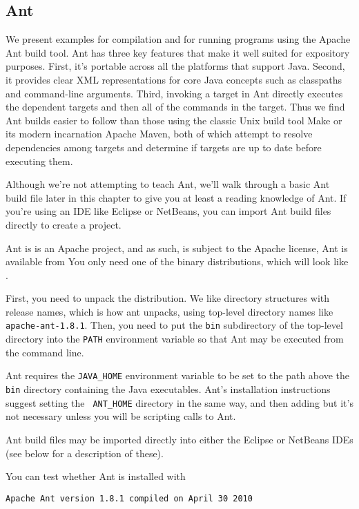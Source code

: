 \subsection{Ant}

We present examples for compilation and for running programs
using the Apache Ant build tool.  Ant has three key features that make
it well suited for expository purposes.  First, it's portable across
all the platforms that support Java.  Second, it provides clear XML
representations for core Java concepts such as classpaths and
command-line arguments.  Third, invoking a target in Ant directly
executes the dependent targets and then all of the commands in the
target.  Thus we find Ant builds easier to follow than those using the
classic Unix build tool Make or its modern incarnation Apache Maven, both
of which attempt to resolve dependencies among targets and determine
if targets are up to date before executing them.

Although we're not attempting to teach Ant, we'll walk through a basic
Ant build file later in this chapter to give you at least a reading
knowledge of Ant.  If you're using an IDE like Eclipse or NetBeans,
you can import Ant build files directly to create a project.

Ant is is an Apache project, and as such, is subject to the Apache license,
%
%
Ant is available from 
%
%
You only need one of the binary distributions, which will
look like .

First, you need to unpack the distribution.  We like directory
structures with release names, which is how ant unpacks, using
top-level directory names like {\tt apache-ant-1.8.1}.  Then, you need
to put the {\tt bin} subdirectory of the top-level directory into the
{\tt PATH} environment variable so that Ant may be executed from the
command line.

Ant requires the {\tt JAVA\_HOME} environment variable to be set to
the path above the {\tt bin} directory containing the Java
executables.  Ant's installation instructions suggest setting the {\tt
ANT\_HOME} directory in the same way, and then adding but it's not
necessary unless you will be scripting calls to Ant.

Ant build files may be imported directly into either the Eclipse or
NetBeans IDEs (see below for a description of these).

You can test whether Ant is installed with
%
\begin{verbatim}
Apache Ant version 1.8.1 compiled on April 30 2010
\end{verbatim}


